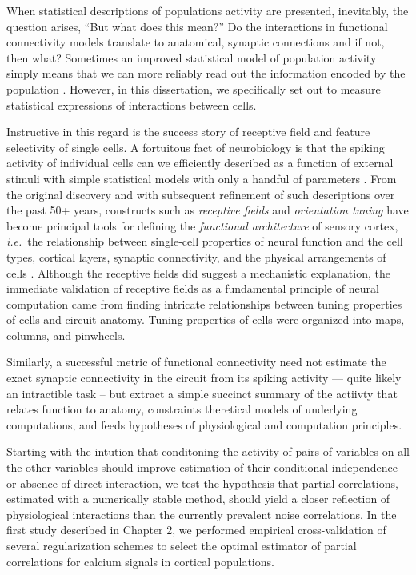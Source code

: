 When statistical descriptions of populations activity are presented, inevitably, the question arises, ``But what does this mean?'' 
Do the interactions in functional connectivity models translate to anatomical, synaptic connections and if not, then what?  Sometimes an improved statistical model of population activity simply means that we can more reliably read out  the information encoded by the population \citep{Pillow:2011}. However, in this dissertation, we specifically set out to measure statistical expressions of interactions between cells. 
 
Instructive in this regard is the success story of receptive field and feature selectivity of single cells. 
A fortuitous fact of neurobiology is that the spiking activity of individual cells can we efficiently described as a function of external stimuli with simple statistical models with only a handful of parameters \citep{Carandini:2005}. From the original discovery and with subsequent refinement of such descriptions over the past 50+ years, constructs such as \emph{receptive fields} and \emph{orientation tuning} have become principal tools for defining the \emph{functional architecture} of sensory cortex, \emph{i.e.}\ the relationship between single-cell properties of neural function and the cell types, cortical layers, synaptic connectivity, and the physical arrangements of cells  \citep{Hubel:1962,Ohki:2005,Reid:2012}. Although the receptive fields did suggest a mechanistic explanation, the immediate validation of receptive fields as a fundamental principle of neural computation came from finding intricate relationships between tuning properties of cells and circuit anatomy. Tuning properties of cells were organized into maps, columns, and pinwheels. 

Similarly, a successful metric of functional connectivity need not estimate the exact synaptic connectivity in the circuit from its spiking activity --- quite likely an intractible task -- but extract a simple succinct summary of the actiivty that relates function to anatomy, constraints theretical models of underlying computations, and feeds hypotheses of  physiological and computation principles.

 Starting with the intution that conditoning the activity of pairs of variables on all the other variables should improve estimation of their conditional independence or absence of direct interaction, we test the hypothesis that partial correlations, estimated with a numerically stable method, should yield a closer reflection of physiological interactions than the currently prevalent noise correlations. In the first study described in Chapter 2, we performed empirical cross-validation of several regularization schemes to select the optimal estimator of partial correlations for calcium signals in cortical populations. 

